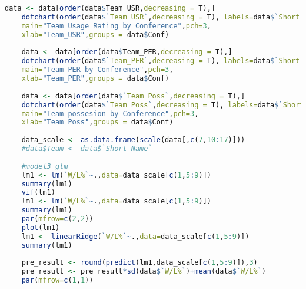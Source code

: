 \begin{lstlisting}[language=R,caption=My code]
	data <- data[order(data$Team_USR,decreasing = T),]
	dotchart(order(data$`Team_USR`,decreasing = T), labels=data$`Short Name`, cex=.7,
	main="Team Usage Rating by Conference",pch=3,
	xlab="Team_USR",groups = data$Conf)
	
	data <- data[order(data$Team_PER,decreasing = T),]
	dotchart(order(data$`Team_PER`,decreasing = T), labels=data$`Short Name`, cex=.7,
	main="Team PER by Conference",pch=3,
	xlab="Team_PER",groups = data$Conf)
	
	data <- data[order(data$`Team_Poss`,decreasing = T),]
	dotchart(order(data$`Team_Poss`,decreasing = T), labels=data$`Short Name`, cex=.7,
	main="Team possesion by Conference",pch=3,
	xlab="Team_Poss",groups = data$Conf)
	
	data_scale <- as.data.frame(scale(data[,c(7,10:17)]))
	#data$Team <- data$`Short Name`
	
	#model3 glm
	lm1 <- lm(`W/L%`~.,data=data_scale[c(1,5:9)])
	summary(lm1)
	vif(lm1)
	lm1 <- lm(`W/L%`~.,data=data_scale[c(1,5:9)])
	summary(lm1)
	par(mfrow=c(2,2))
	plot(lm1)
	lm1 <- linearRidge(`W/L%`~.,data=data_scale[c(1,5:9)])
	summary(lm1)
	
	pre_result <- round(predict(lm1,data_scale[c(1,5:9)]),3)
	pre_result <- pre_result*sd(data$`W/L%`)+mean(data$`W/L%`)
	par(mfrow=c(1,1))
\end{lstlisting}




